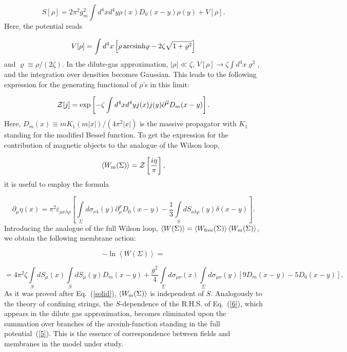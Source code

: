 \documentclass[a4paper,12pt]{article}
\begin{document}
\begin{equation}
\label{srho}
S[\rho]=2\pi^2g_m^2\int d^4xd^4y\rho(x)D_0(x-y)\rho(y)+V[\rho].
\end{equation}
Here, the potential reads

\begin{equation}
\label{5}
V[\rho]=\int d^4x\left[\rho{\,}{\rm arcsinh}
\varrho-
2\zeta\sqrt{1+\varrho^2}\right] 
\end{equation}
and $\varrho\equiv\rho/(2\zeta)$.
In the dilute-gas approximation, $|\rho|\ll\zeta$, $V[\rho]\to\zeta\int d^4x\varrho^2$, and 
the integration over densities becomes Gaussian. This leads to the following expression  
for the generating functional of $\rho$'s in this limit:

\begin{equation}
\label{gf}
{\cal Z}[j]=\exp\left[-\zeta\int d^4xd^4yj(x)j(y)\partial^2D_m(x-y)\right].
\end{equation}
Here, $D_m(x)\equiv mK_1(m|x|)/(4\pi^2|x|)$ is the massive propagator with $K_1$ standing 
for the modified Bessel function. To get the expression for the contribution of magnetic objects to the analogue of the 
Wilson loop, 

\begin{equation}
\label{Zeta}
\left<W_{\rm m}(\Sigma)\right>={\cal Z}\left[\frac{i\eta}{\pi}\right],
\end{equation}
it is useful to employ the formula

$$
\partial_\mu\eta(x)=\pi^2\varepsilon_{\mu\nu\lambda\rho}\left[\int\limits_{\Sigma}^{}d\sigma_{\nu\lambda}(y)
\partial_\rho^xD_0(x-y)-\frac13\int\limits_{S}^{}dS_{\nu\lambda\rho}(y)\delta(x-y)\right].$$
Introducing the analogue of the full Wilson loop, $\left<W(\Sigma)\right>=\left<W_{\rm free}(\Sigma)\right>
\left<W_{\rm m}(\Sigma)\right>$, we obtain the following membrane action:

$$-\ln\left<W(\Sigma)\right>=$$

\begin{equation}
\label{6}
=4\pi^2\zeta\int\limits_{S}^{}dS_\mu(x)\int\limits_{S}^{}dS_\mu(y)D_m(x-y)+
\frac{g^2}{4}\int\limits_{\Sigma}^{}d\sigma_{\mu\nu}(x)\int\limits_{\Sigma}^{}d\sigma_{\mu\nu}(y)
\left[9D_m(x-y)-5D_0(x-y)\right].
\end{equation}
As it was proved after Eq.~(\ref{solid}), $\left<W_{\rm m}(\Sigma)\right>$ is independent of $S$. 
Analogously to the theory of confining strings, the $S$-dependence of the R.H.S. of Eq.~(\ref{6}),
which appears in the dilute gas approximation, 
becomes eliminated upon the summation over branches of the arcsinh-function standing 
in the full potential~(\ref{5}). This is the essence of correspondence between fields and membranes in the 
model under study. 
\end{document}
